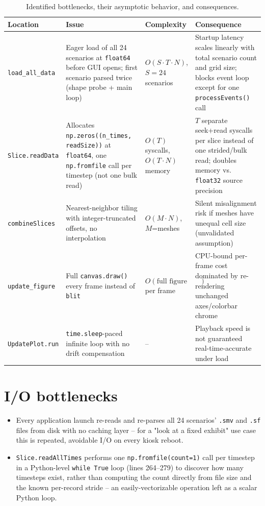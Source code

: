 \documentclass[11pt,a4paper]{report}
\begin{document}
\begin{table}[h]
\centering
\small
\begin{tabular}{p{3.3cm}p{4.6cm}p{2.2cm}p{4.0cm}}
\toprule
\textbf{Location} & \textbf{Issue} & \textbf{Complexity} & \textbf{Consequence} \\
\midrule
\texttt{load\_all\_data} & Eager load of all 24 scenarios at \texttt{float64} before GUI opens;
first scenario parsed twice (shape probe + main loop) & $O(S \cdot T \cdot N)$, $S{=}24$ scenarios & Startup latency scales linearly with total scenario count and grid size; blocks event loop except for one \texttt{processEvents()} call \\
\texttt{Slice.readData} & Allocates \texttt{np.zeros((n\_times, readSize))} at \texttt{float64}, one \texttt{np.fromfile} call per timestep (not one bulk read) & $O(T)$ syscalls, $O(T \cdot N)$ memory & $T$ separate seek+read syscalls per slice instead of one strided/bulk read; doubles memory vs. \texttt{float32} source precision \\
\texttt{combineSlices} & Nearest-neighbor tiling with integer-truncated offsets, no interpolation & $O(M \cdot N)$, $M$=meshes & Silent misalignment risk if meshes have unequal cell size (unvalidated assumption) \\
\texttt{update\_figure} & Full \texttt{canvas.draw()} every frame instead of \texttt{blit} & $O(\text{full figure raster})$ per frame & CPU-bound per-frame cost dominated by re-rendering unchanged axes/colorbar chrome \\
\texttt{UpdatePlot.run} & \texttt{time.sleep}-paced infinite loop with no drift compensation & -- & Playback speed is not guaranteed real-time-accurate under load \\
\bottomrule
\end{tabular}
\caption{Identified bottlenecks, their asymptotic behavior, and consequences.}
\end{table}

\section{I/O bottlenecks}
\begin{itemize}[nosep]
\item Every application launch re-reads and re-parses all 24 scenarios' \texttt{.smv} and \texttt{.sf}
files from disk with no caching layer -- for a "look at a fixed exhibit" use case this is repeated,
avoidable I/O on every kiosk reboot.
\item \texttt{Slice.readAllTimes} performs one \texttt{np.fromfile(count=1)} call per timestep in a
Python-level \texttt{while True} loop (lines 264--279) to discover how many timesteps exist, rather
than computing the count directly from file size and the known per-record stride -- an
easily-vectorizable operation left as a scalar Python loop.
\end{itemize}
\end{document}
